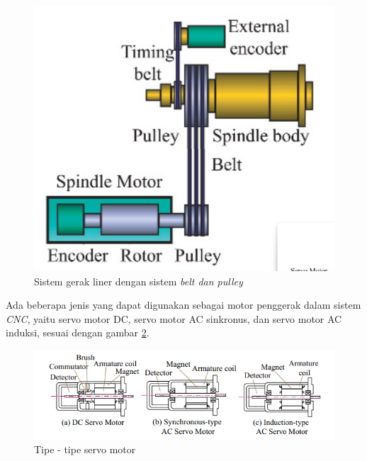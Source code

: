 \begin{figure}[H]
    \centering
    \includegraphics[width=0.4\linewidth]{gambar/pully-mech.png}
    \caption{Sistem gerak liner dengan sistem \textit{belt dan pulley}}
    \label{fig:pulley}
\end{figure}

Ada beberapa jenis yang dapat digunakan sebagai motor penggerak dalam sistem \textit{CNC}, yaitu servo motor DC, servo motor AC sinkronus, dan servo motor AC induksi, sesuai dengan gambar \ref{fig:servo-types}.

\begin{figure}[H]
    \centering
    \includegraphics[width=0.8\linewidth]{gambar/servo-motor-diff.png}
    \caption{Tipe - tipe servo motor}
    \label{fig:servo-types}
\end{figure}

